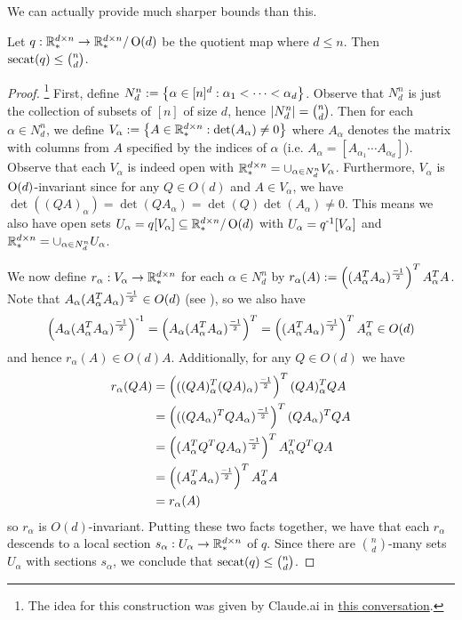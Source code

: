 We can actually provide much sharper bounds than this.


\begin{theorem}\label{thm:Od-full-rank-secat-upper-bound}
    Let $q : \mathbb{R}^{d \times n}_* \to \mathbb{R}^{d \times n}_* / \operatorname{O}(d)$ be the quotient map where $d \leq n$.
    Then $\operatorname{secat}(q) \leq \binom{n}{d}$.
    
    \begin{proof}
        \footnote{The idea for this construction was given by Claude.ai in \href{https://claude.ai/share/48cf83a5-596b-4b34-a528-11fade173839}{this conversation}.}
        First, define $N^n_d := \left\{ \alpha \in [n]^d : \alpha_1 < \cdots < \alpha_d \right\}$.
        Observe that $N^n_d$ is just the collection of subsets of $[n]$ of size $d$, hence $\left| N^n_d \right| = \binom{n}{d}$.
        Then for each $\alpha \in N^n_d$, we define $V_\alpha := \left\{ A \in \mathbb{R}^{d \times n}_* : \det (A_\alpha) \neq 0 \right\}$ where $A_\alpha$ denotes the matrix with columns from $A$ specified by the indices of $\alpha$ (i.e. $A_\alpha = [A_{\alpha_1} \cdots A_{\alpha_d}]$).
        Observe that each $V_\alpha$ is indeed open with $\mathbb{R}^{d \times n}_* = \cup_{\alpha \in N^n_d} V_\alpha$.
        Furthermore, $V_\alpha$ is $\operatorname{O}(d)$-invariant since for any $Q \in O(d)$ and $A \in V_\alpha$, we have $\det((QA)_\alpha) = \det(QA_\alpha) = \det(Q)\det(A_\alpha) \neq 0$.
        This means we also have open sets $U_\alpha = q[V_\alpha] \subseteq \mathbb{R}^{d \times n}_* / \operatorname{O}(d)$ with $U_\alpha = q^{\text{-}1}[V_\alpha]$ and $\mathbb{R}^{d \times n}_* = \cup_{\alpha \in N^n_d} U_\alpha$.
        
        We now define $r_\alpha : V_\alpha \to \mathbb{R}^{d \times n}_*$ for each $\alpha \in N^n_d$ by $r_\alpha(A) := \left( (A_\alpha^T A_\alpha)^{\frac{-1}{2}} \right)^T A_\alpha^T A$.
        Note that $A_\alpha (A_\alpha^T A_\alpha)^{\frac{-1}{2}} \in O(d)$ (see \cite{wikipedia:polar-decomposition}), so we also have
        \[
            \left( A_\alpha (A_\alpha^T A_\alpha)^{\frac{-1}{2}} \right)^{\text{-}1}
            = \left( A_\alpha (A_\alpha^T A_\alpha)^{\frac{-1}{2}} \right)^T
            = \left( (A_\alpha^T A_\alpha)^{\frac{-1}{2}} \right)^T A_\alpha^T \in O(d)
        \]
        and hence $r_\alpha(A) \in O(d)A$.
        Additionally, for any $Q \in O(d)$ we have
        \begin{align*}
            r_\alpha (QA)
            &= \left( ((QA)_\alpha^T (QA)_\alpha)^{\frac{-1}{2}} \right)^T (QA)_\alpha^T QA \\
            &= \left( ((QA_\alpha)^T Q A_\alpha)^{\frac{-1}{2}} \right)^T (QA_\alpha)^T QA \\
            &= \left( (A_\alpha^T Q^T Q A_\alpha)^{\frac{-1}{2}} \right)^T A_\alpha^T Q^T QA \\
            &= \left( (A_\alpha^T A_\alpha)^{\frac{-1}{2}} \right)^T A_\alpha^T A \\
            &= r_\alpha(A)
        \end{align*}
        so $r_\alpha$ is $O(d)$-invariant.
        Putting these two facts together, we have that each $r_\alpha$ descends to a local section $s_\alpha : U_\alpha \to \mathbb{R}^{d \times n}_*$ of $q$.
        Since there are $\binom{n}{d}$-many sets $U_\alpha$ with sections $s_\alpha$, we conclude that $\operatorname{secat}(q) \leq \binom{n}{d}$.
    \end{proof}
\end{theorem}


